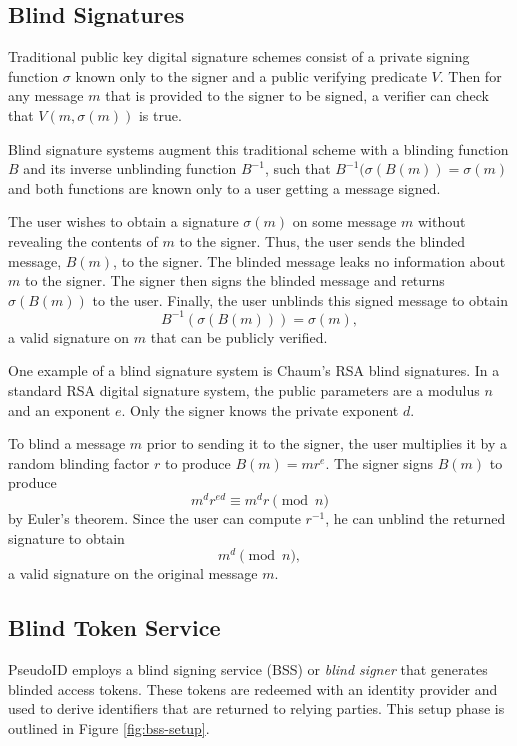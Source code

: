 \documentclass{llncs}
\begin{document}
\subsection{Blind Signatures}
\label{section:blind-sigs}

Traditional public key digital signature schemes \cite{DH76} consist
of a private signing function $\sigma$ known only to the signer and a
public verifying predicate $V$. Then for any message $m$ that is
provided to the signer to be signed, a verifier can check that $V(m,
\sigma(m))$ is true.

Blind signature systems \cite{Cha82} augment this traditional scheme
with a blinding function $B$ and its inverse unblinding function
$B^{-1}$, such that $B^{-1}(\sigma(B(m)) = \sigma(m)$ and both
functions are known only to a user getting a message signed.

The user wishes to obtain a signature $\sigma(m)$ on some message
$m$ without revealing the contents of $m$ to the signer. Thus, the
user sends the blinded message, $B(m)$, to the signer. The blinded
message leaks no information about $m$ to the signer. The signer then
signs the blinded message and returns $\sigma(B(m))$ to the
user. Finally, the user unblinds this signed message to
obtain $$B^{-1}(\sigma(B(m))) = \sigma(m),$$ a valid signature on $m$
that can be publicly verified.

One example of a blind signature system is Chaum's RSA blind signatures. In a
standard RSA digital signature system, the public parameters are a modulus $n$
and an exponent $e$. Only the signer knows the private exponent $d$.

To blind a message $m$ prior to sending it to the signer, the user
multiplies it by a random blinding factor $r$ to produce $B(m) =
mr^e$. The signer signs $B(m)$ to produce $$m^d r^{ed} \equiv m^d r
\pmod n$$ by Euler's theorem. Since the user can compute $r^{-1}$,
he can unblind the returned signature to obtain $$m^d \pmod n,$$ a
valid signature on the original message $m$.


\subsection{Blind Token Service}

PseudoID employs a blind signing service (BSS) or \textit{blind
  signer} that generates blinded access tokens. These tokens are
redeemed with an identity provider and used to derive identifiers that
are returned to relying parties. This setup phase is outlined in
Figure \ref{fig:bss-setup}.
\end{document}
